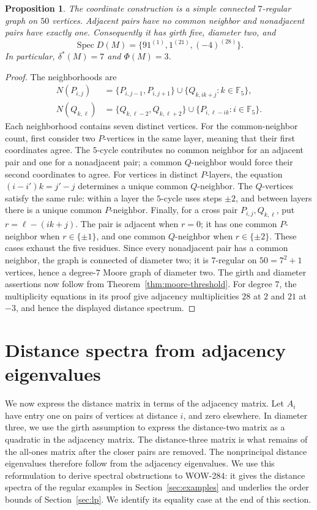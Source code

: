 \documentclass[a4paper,10pt,reqno]{amsart}
\theoremstyle{plain}
\newtheorem{proposition}[theorem]{Proposition}
\theoremstyle{definition}
\theoremstyle{remark}
\newcommand{\F}{\mathbb F_5}
\newcommand{\Spec}{\operatorname{Spec}}
\begin{document}
\begin{proposition}\label{prop:hs-coordinate}
The coordinate construction is a simple connected \(7\)-regular graph on
\(50\) vertices.  Adjacent pairs have no common neighbor and nonadjacent pairs
have exactly one.  Consequently it has girth five, diameter two, and
\[
 \Spec D(M)=\{91^{(1)},1^{(21)},(-4)^{(28)}\}.
\]
In particular, \(\delta^*(M)=7\) and \(\Phi(M)=3\).
\end{proposition}

\begin{proof}
The neighborhoods are
\begin{align*}
N(P_{i,j})&=\{P_{i,j-1},P_{i,j+1}\}
 \cup\{Q_{k,ik+j}:k\in\F\},\\
N(Q_{k,\ell})&=\{Q_{k,\ell-2},Q_{k,\ell+2}\}
 \cup\{P_{i,\ell-ik}:i\in\F\}.
\end{align*}
Each neighborhood contains seven distinct vertices. For the
common-neighbor count, first consider two \(P\)-vertices in the same layer, meaning that their
first coordinates agree.
The \(5\)-cycle contributes no common neighbor for an adjacent pair and
one for a nonadjacent pair; a common \(Q\)-neighbor would force their
second coordinates to agree.  For vertices in distinct \(P\)-layers, the
equation \((i-i')k=j'-j\) determines a unique common \(Q\)-neighbor.
The \(Q\)-vertices satisfy the same rule: within a layer the
\(5\)-cycle uses steps \(\pm2\), and between layers there is a unique
common \(P\)-neighbor.  Finally, for a cross pair
\(P_{i,j},Q_{k,\ell}\), put \(r=\ell-(ik+j)\).  The pair is adjacent
when \(r=0\); it has one common \(P\)-neighbor when
\(r\in\{\pm1\}\), and one common \(Q\)-neighbor when
\(r\in\{\pm2\}\).  These cases exhaust the five residues.
Since every nonadjacent pair has a common neighbor, the graph is connected
of diameter two; it is \(7\)-regular on \(50=7^2+1\) vertices, hence a
degree-\(7\) Moore graph of diameter two. The girth and diameter assertions
now follow from Theorem~\ref{thm:moore-threshold}.  For degree \(7\), the
multiplicity equations in its proof give adjacency multiplicities \(28\) at
\(2\) and \(21\) at \(-3\), and hence the displayed distance spectrum.
\end{proof}

\section{Distance spectra from adjacency eigenvalues}\label{sec:score-calculus}

We now express the distance matrix in terms of the adjacency matrix.
Let \(A_i\) have entry one on pairs of vertices at distance \(i\), and
zero elsewhere. In diameter three, we use the girth assumption to express
the distance-two matrix as a quadratic in the adjacency matrix. The
distance-three matrix is what remains of the all-ones matrix after the
closer pairs are removed. The nonprincipal distance eigenvalues therefore
follow from the adjacency eigenvalues. We use this reformulation to
derive spectral obstructions to WOW-284: it gives the distance spectra of
the regular examples in Section~\ref{sec:examples} and underlies the order
bounds of Section~\ref{sec:lp}. We identify its equality case at the end of
this section.
\end{document}
